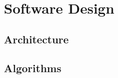 \section{Software Design}

\subsection{Architecture}

\subsubsection{}

\subsubsection{}

\subsection{Algorithms}

